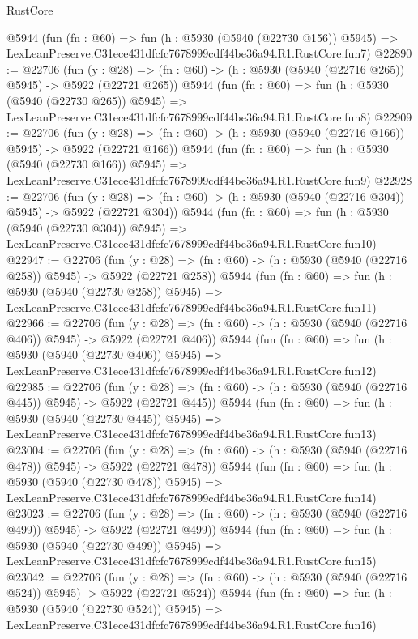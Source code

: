\begin{lexlean}{RustCore}
\begin{coremodule}
    @5944
    (fun (fn : @60) =>
    fun (h : @5930 (@5940 (@22730 @156)) @5945) =>
    LexLeanPreserve.C31ece431dfcfc7678999cdf44be36a94.R1.RustCore.fun7)
@22890 := @22706
    (fun (y : @28) => (fn : @60) -> (h : @5930 (@5940 (@22716 @265)) @5945) -> @5922 (@22721 @265))
    @5944
    (fun (fn : @60) =>
    fun (h : @5930 (@5940 (@22730 @265)) @5945) =>
    LexLeanPreserve.C31ece431dfcfc7678999cdf44be36a94.R1.RustCore.fun8)
@22909 := @22706
    (fun (y : @28) => (fn : @60) -> (h : @5930 (@5940 (@22716 @166)) @5945) -> @5922 (@22721 @166))
    @5944
    (fun (fn : @60) =>
    fun (h : @5930 (@5940 (@22730 @166)) @5945) =>
    LexLeanPreserve.C31ece431dfcfc7678999cdf44be36a94.R1.RustCore.fun9)
@22928 := @22706
    (fun (y : @28) => (fn : @60) -> (h : @5930 (@5940 (@22716 @304)) @5945) -> @5922 (@22721 @304))
    @5944
    (fun (fn : @60) =>
    fun (h : @5930 (@5940 (@22730 @304)) @5945) =>
    LexLeanPreserve.C31ece431dfcfc7678999cdf44be36a94.R1.RustCore.fun10)
@22947 := @22706
    (fun (y : @28) => (fn : @60) -> (h : @5930 (@5940 (@22716 @258)) @5945) -> @5922 (@22721 @258))
    @5944
    (fun (fn : @60) =>
    fun (h : @5930 (@5940 (@22730 @258)) @5945) =>
    LexLeanPreserve.C31ece431dfcfc7678999cdf44be36a94.R1.RustCore.fun11)
@22966 := @22706
    (fun (y : @28) => (fn : @60) -> (h : @5930 (@5940 (@22716 @406)) @5945) -> @5922 (@22721 @406))
    @5944
    (fun (fn : @60) =>
    fun (h : @5930 (@5940 (@22730 @406)) @5945) =>
    LexLeanPreserve.C31ece431dfcfc7678999cdf44be36a94.R1.RustCore.fun12)
@22985 := @22706
    (fun (y : @28) => (fn : @60) -> (h : @5930 (@5940 (@22716 @445)) @5945) -> @5922 (@22721 @445))
    @5944
    (fun (fn : @60) =>
    fun (h : @5930 (@5940 (@22730 @445)) @5945) =>
    LexLeanPreserve.C31ece431dfcfc7678999cdf44be36a94.R1.RustCore.fun13)
@23004 := @22706
    (fun (y : @28) => (fn : @60) -> (h : @5930 (@5940 (@22716 @478)) @5945) -> @5922 (@22721 @478))
    @5944
    (fun (fn : @60) =>
    fun (h : @5930 (@5940 (@22730 @478)) @5945) =>
    LexLeanPreserve.C31ece431dfcfc7678999cdf44be36a94.R1.RustCore.fun14)
@23023 := @22706
    (fun (y : @28) => (fn : @60) -> (h : @5930 (@5940 (@22716 @499)) @5945) -> @5922 (@22721 @499))
    @5944
    (fun (fn : @60) =>
    fun (h : @5930 (@5940 (@22730 @499)) @5945) =>
    LexLeanPreserve.C31ece431dfcfc7678999cdf44be36a94.R1.RustCore.fun15)
@23042 := @22706
    (fun (y : @28) => (fn : @60) -> (h : @5930 (@5940 (@22716 @524)) @5945) -> @5922 (@22721 @524))
    @5944
    (fun (fn : @60) =>
    fun (h : @5930 (@5940 (@22730 @524)) @5945) =>
    LexLeanPreserve.C31ece431dfcfc7678999cdf44be36a94.R1.RustCore.fun16)

\end{coremodule}
\end{lexlean}
